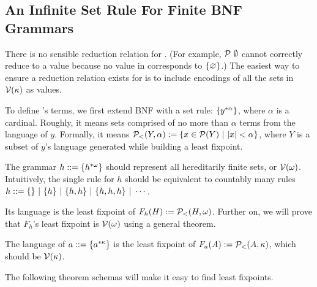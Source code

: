 \subsection{An Infinite Set Rule For Finite BNF Grammars}

\newcommand{\setkleene}[2]{\ensuremath{\set{{#1}^{*{#2}}}}}

There is no sensible reduction relation for \ftargetlang. (For example, $\powerset~\lemptyset$ cannot correctly reduce to a value because no value in \ftargetlang corresponds to $\{{\varnothing}\}$.) The easiest way to ensure a reduction relation exists for \targetlang is to include encodings of all the sets in $\mathcal{V}(\kappa)$ as values.

To define \targetlang's terms, we first extend BNF with a set rule: \setkleene{y}{\alpha}, where $\alpha$ is a cardinal. Roughly, it means sets comprised of no more than $\alpha$ terms from the language of $y$.
Formally, it means $\mathcal{P}_<(Y,\alpha) := \lbrace {x \in \mathcal{P}(Y)} \ \lvert\ {|x| < \alpha} \rbrace$, where $Y$ is a subset of $y$'s language generated while building a least fixpoint.

\begin{example}
The grammar $h ::= \setkleene{h}{\omega}$ should represent all hereditarily finite sets, or $\mathcal{V}(\omega)$. Intuitively, the single rule for $h$ should be equivalent to countably many rules $h ::= \{{}\} \ |\  \{{h}\} \ |\  \{{h,h}\} \ |\  \{{h,h,h}\} \ |\  \cdots$.

Its language is the least fixpoint of $F_h(H) := \mathcal{P}_<(H,\omega)$. Further on, we will prove that $F_h$'s least fixpoint is $\mathcal{V}(\omega)$ using a general theorem.
\exampleqed
\end{example}

\begin{example}
The language of $a ::= \setkleene{a}{\kappa}$ is the least fixpoint of $F_a(A) := \mathcal{P}_<(A,\kappa)$, which should be $\mathcal{V}(\kappa)$.
\exampleqed
\end{example}

The following theorem schemas will make it easy to find least fixpoints.

